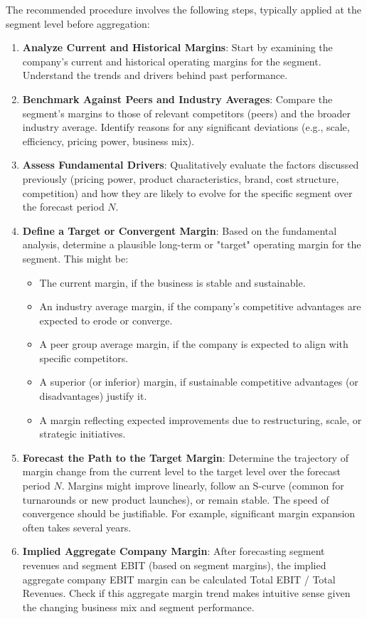 The recommended procedure involves the following steps, typically applied at the segment level before aggregation:

\begin{enumerate}
    \item \textbf{Analyze Current and Historical Margins}: Start by examining the company's current and historical operating margins for the segment. Understand the trends and drivers behind past performance.
    \item \textbf{Benchmark Against Peers and Industry Averages}: Compare the segment's margins to those of relevant competitors (peers) and the broader industry average. Identify reasons for any significant deviations (e.g., scale, efficiency, pricing power, business mix).
    \item \textbf{Assess Fundamental Drivers}: Qualitatively evaluate the factors discussed previously (pricing power, product characteristics, brand, cost structure, competition) and how they are likely to evolve for the specific segment over the forecast period \(N\).
    \item \textbf{Define a Target or Convergent Margin}: Based on the fundamental analysis, determine a plausible long-term or "target" operating margin for the segment. This might be:
          \begin{itemize}
              \item The current margin, if the business is stable and sustainable.
              \item An industry average margin, if the company's competitive advantages are expected to erode or converge.
              \item A peer group average margin, if the company is expected to align with specific competitors.
              \item A superior (or inferior) margin, if sustainable competitive advantages (or disadvantages) justify it.
              \item A margin reflecting expected improvements due to restructuring, scale, or strategic initiatives.
          \end{itemize}
    \item \textbf{Forecast the Path to the Target Margin}: Determine the trajectory of margin change from the current level to the target level over the forecast period \(N\). Margins might improve linearly, follow an S-curve (common for turnarounds or new product launches), or remain stable. The speed of convergence should be justifiable. For example, significant margin expansion often takes several years.
    \item \textbf{Implied Aggregate Company Margin}: After forecasting segment revenues and segment EBIT (based on segment margins), the implied aggregate company EBIT margin can be calculated Total EBIT / Total Revenues. Check if this aggregate margin trend makes intuitive sense given the changing business mix and segment performance.
\end{enumerate}


